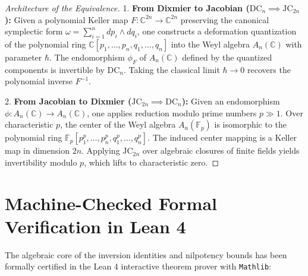 \documentclass[11pt,a4paper]{article}
\theoremstyle{definition}
\begin{document}
\begin{proof}[Architecture of the Equivalence]
1. \textbf{From Dixmier to Jacobian ($\mathrm{DC}_n \implies \mathrm{JC}_{2n}$):}
Given a polynomial Keller map $F: \mathbb{C}^{2n} \to \mathbb{C}^{2n}$ preserving the canonical symplectic form $\omega = \sum_{i=1}^n dp_i \wedge dq_i$, one constructs a deformation quantization of the polynomial ring $\mathbb{C}[p_1, \dots, p_n, q_1, \dots, q_n]$ into the Weyl algebra $A_n(\mathbb{C})$ with parameter $\hbar$.
The endomorphism $\phi_F$ of $A_n(\mathbb{C})$ defined by the quantized components is invertible by $\mathrm{DC}_n$. Taking the classical limit $\hbar \to 0$ recovers the polynomial inverse $F^{-1}$.

2. \textbf{From Jacobian to Dixmier ($\mathrm{JC}_{2n} \implies \mathrm{DC}_n$):}
Given an endomorphism $\phi: A_n(\mathbb{C}) \to A_n(\mathbb{C})$, one applies reduction modulo prime numbers $p \gg 1$. Over characteristic $p$, the center of the Weyl algebra $A_n(\mathbb{F}_p)$ is isomorphic to the polynomial ring $\mathbb{F}_p[p_1^p, \dots, p_n^p, q_1^p, \dots, q_n^p]$. The induced center mapping is a Keller map in dimension $2n$. Applying $\mathrm{JC}_{2n}$ over algebraic closures of finite fields yields invertibility modulo $p$, which lifts to characteristic zero.
\end{proof}

\section{Machine-Checked Formal Verification in Lean 4}

The algebraic core of the inversion identities and nilpotency bounds has been formally certified in the Lean 4 interactive theorem prover with \texttt{Mathlib}:
\end{document}
